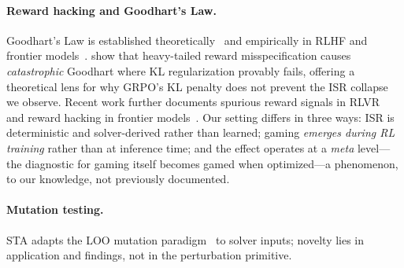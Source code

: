 \paragraph{Reward hacking and Goodhart's Law.}
Goodhart's Law is established theoretically~\citep{manheim-goodhart-taxonomy, skalse-reward-hacking, karwowski-goodhart-rl} and empirically in RLHF and frontier models~\citep{gao-reward-overoptimization, bondarenko-spec-gaming, kim-game-formalization}.
\citet{kwa-catastrophic-goodhart} show that heavy-tailed reward misspecification causes \emph{catastrophic} Goodhart where KL regularization provably fails, offering a theoretical lens for why GRPO's KL penalty does not prevent the ISR collapse we observe.
Recent work further documents spurious reward signals in RLVR~\citep{spurious-rewards} and reward hacking in frontier models~\citep{metr-reward-hacking}.
Our setting differs in three ways: ISR is deterministic and solver-derived rather than learned; gaming \emph{emerges during RL training} rather than at inference time; and the effect operates at a \emph{meta} level---the diagnostic for gaming itself becomes gamed when optimized---a phenomenon, to our knowledge, not previously documented.

\paragraph{Mutation testing.}
STA adapts the LOO mutation paradigm~\citep{demillo1978, jia-harman-survey} to solver inputs; novelty lies in application and findings, not in the perturbation primitive.
